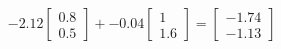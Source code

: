 \documentclass[preview]{standalone}
\begin{document}
\begin{align*}
-2.12 \begin{bmatrix} 0.8 \\ 0.5 \end{bmatrix} + -0.04 \begin{bmatrix} 1 \\ 1.6 \end{bmatrix} = \begin{bmatrix} -1.74 \\ -1.13 \end{bmatrix}
\end{align*}
\end{document}
